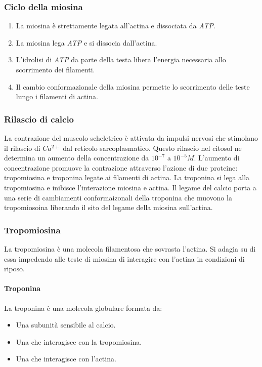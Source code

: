 		\subsubsection{Ciclo della miosina}
		\begin{multicols}{2}
			\begin{enumerate}
				\item La miosina \`e strettamente legata all'actina e dissociata da \emph{ATP}.
				\item La miosina lega \emph{ATP} e si dissocia dall'actina.
				\item L'idrolisi di \emph{ATP} da parte della testa libera l'energia necessaria allo scorrimento dei filamenti.
				\item Il cambio conformazionale della miosina permette lo scorrimento delle teste lungo i filamenti di actina.
			\end{enumerate}
		\end{multicols}

		\subsubsection{Rilascio di calcio}
		La contrazione del muscolo scheletrico \`e attivata da impulsi nervosi che stimolano il rilascio di \emph{$Ca^{2+}$} dal reticolo sarcoplasmatico.
		Questo rilascio nel citosol ne determina un aumento della concentrazione da $10^{-7}$ a $10^{-5}M$.
		L'aumento di concentrazione promuove la contrazione attraverso l'azione di due proteine: tropomiosina e troponina legate ai filamenti di actina.
		La troponina si lega alla tropomiosina e inibisce l'interazione miosina e actina.
		Il legame del calcio porta a una serie di cambiamenti conformaizonali della troponina che muovono la tropomiosoina liberando il sito del legame della miosina sull'actina.

		\subsubsection{Tropomiosina}
		La tropomiosina \`e una molecola filamentosa che sovrasta l'actina.
		Si adagia su di essa impedendo alle teste di miosina di interagire con l'actina in condizioni di riposo.

			\paragraph{Troponina}
			La troponina \`e una molecola globulare formata da:
			\begin{multicols}{2}
				\begin{itemize}
					\item Una subunit\`a sensibile al calcio.
					\item Una che interagisce con la tropomiosina.
					\item Una che interagisce con l'actina.
				\end{itemize}
			\end{multicols}
			

